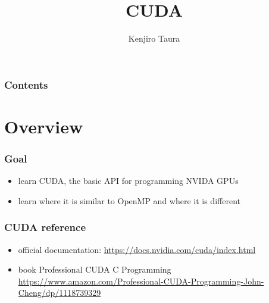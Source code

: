 \documentclass[12pt,dvipdfmx]{beamer}
\title{CUDA}
\institute{}
\author{Kenjiro Taura}
\date{}
\begin{document}
\maketitle

\begin{frame}
\frametitle{Contents}
\tableofcontents
\end{frame}


\section{Overview}

\begin{frame}
\frametitle{Goal}
\begin{itemize}
\item learn CUDA, the basic API for programming NVIDA GPUs
\item learn where it is similar to OpenMP and where it is different
\end{itemize}
\end{frame}

\begin{frame}
\frametitle{CUDA reference}
\begin{itemize}
\item official documentation:
  \url{https://docs.nvidia.com/cuda/index.html}
  
\item book Professional CUDA C Programming
  \url{https://www.amazon.com/Professional-CUDA-Programming-John-Cheng/dp/1118739329}
\end{itemize}
\end{frame}
\end{document}
